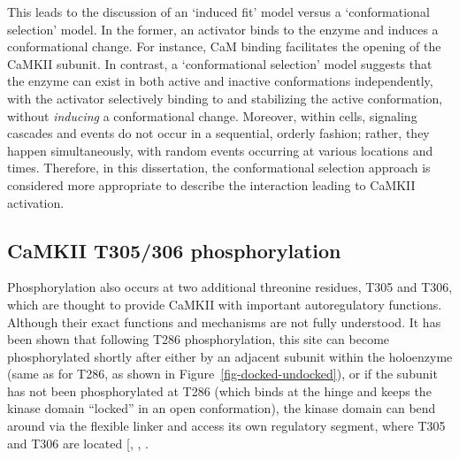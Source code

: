 \documentclass[
  11pt,
  letterpaper,
]{scrreprt}
\begin{document}
This leads to the discussion of an `induced fit' model versus a
`conformational selection' model. In the former, an activator binds to
the enzyme and induces a conformational change. For instance, CaM
binding facilitates the opening of the CaMKII subunit. In contrast, a
`conformational selection' model suggests that the enzyme can exist in
both active and inactive conformations independently, with the activator
selectively binding to and stabilizing the active conformation, without
\emph{inducing} a conformational change. Moreover, within cells,
signaling cascades and events do not occur in a sequential, orderly
fashion; rather, they happen simultaneously, with random events
occurring at various locations and times. Therefore, in this
dissertation, the conformational selection approach is considered more
appropriate to describe the interaction leading to CaMKII activation.

\subsection{CaMKII T305/306 phosphorylation}\label{sec-t305-p}

Phosphorylation also occurs at two additional threonine residues, T305
and T306, which are thought to provide CaMKII with important
autoregulatory functions. Although their exact functions and mechanisms
are not fully understood. It has been shown that following T286
phosphorylation, this site can become phosphorylated shortly after
either by an adjacent subunit within the holoenzyme (same as for T286,
as shown in Figure~\ref{fig-docked-undocked}), or if the subunit has not
been phosphorylated at T286 (which binds at the hinge and keeps the
kinase domain ``locked'' in an open conformation), the kinase domain can
bend around via the flexible linker and access its own regulatory
segment, where T305 and T306 are located
{[},
,
\citeproc{ref-pi2010Autonomousa}{196}{]}.
\end{document}
